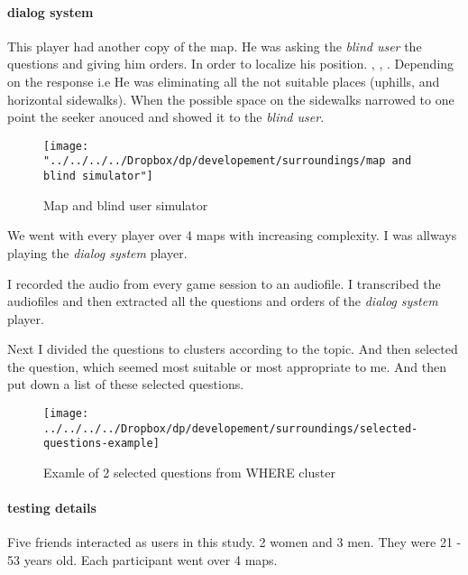 				\paragraph{dialog system}
					This player had another copy of the map. He was asking the \emph{blind user} the questions and giving him orders. In order to localize his position. , , . Depending on the response i.e  He was
					eliminating all the not suitable places (uphills, and horizontal sidewalks). When the possible
					space on the sidewalks narrowed to one point the seeker anouced 
					and showed it to the \emph{blind user}.	
				
				\begin{figure}[th]
					\centering
					\texttt{[image: "../../../../Dropbox/dp/developement/surroundings/map and blind simulator"]}
					\caption{Map and blind user simulator}
					\label{fig:map-and-blind-simulator}
				\end{figure}
				
				We went with every player over 4 maps with increasing complexity. 
				I was allways playing the \emph{dialog system} player.
				
				I recorded the audio from every game session to an audiofile. I transcribed the audiofiles and then extracted all the questions and orders of the \emph{dialog system} player.
				
				Next I divided the questions to clusters according to the topic. And then selected the question, which seemed most suitable or most appropriate to me. And then put down a list of these selected questions.
			
				\begin{figure}[th]
					\centering
					\texttt{[image: ../../../../Dropbox/dp/developement/surroundings/selected-questions-example]}
					\caption{Examle of 2 selected questions from WHERE cluster}
					\label{fig:clusteredquestions}
				\end{figure}
			
				\paragraph{testing details}
					Five friends interacted as users in this study. 2 women and 3 men. They were 21 - 53 years old. Each participant went over 4 maps.
			
